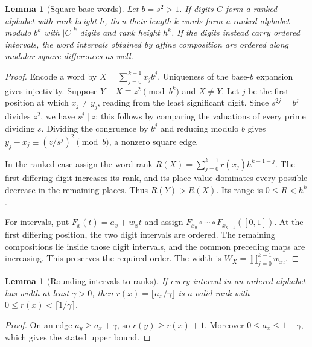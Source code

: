 \documentclass[11pt]{article}
\newtheorem{lemma}[theorem]{Lemma}
\theoremstyle{definition}
\theoremstyle{remark}
\newcommand{\card}[1]{\lvert #1\rvert}
\begin{document}
\begin{lemma}[Square-base words]\label{lem:words}
Let $b=s^2>1$. If digits $C$ form a ranked alphabet with rank height $h$,
then their length-$k$ words form a ranked alphabet modulo $b^k$ with
$\card C^k$ digits and rank height $h^k$. If the digits instead carry
ordered intervals, the word intervals obtained by affine composition are
ordered along modular square differences as well.
\end{lemma}
\begin{proof}
Encode a word by $X=\sum_{j=0}^{k-1}x_jb^j$. Uniqueness of the base-$b$
expansion gives injectivity. Suppose $Y-X\equiv z^2\pmod{b^k}$ and $X\ne Y$.
Let $j$ be the first position at which $x_j\ne y_j$, reading from the
least significant digit. Since $s^{2j}=b^j$ divides $z^2$, we have
$s^j\mid z$: this follows by comparing the valuations of every prime
dividing $s$. Dividing the congruence by $b^j$ and reducing modulo $b$
gives $y_j-x_j\equiv(z/s^j)^2\pmod b$, a nonzero square edge.

In the ranked case assign the word rank
$R(X)=\sum_{j=0}^{k-1}r(x_j)h^{k-1-j}$. The first differing digit increases
its rank, and its place value dominates every possible decrease in the
remaining places. Thus $R(Y)>R(X)$. Its range is $0\le R<h^k$.

For intervals, put $F_x(t)=a_x+w_xt$ and assign
$F_{x_0}\circ\cdots\circ F_{x_{k-1}}([0,1])$. At the first differing
position, the two digit intervals are ordered. The remaining compositions
lie inside those digit intervals, and the common preceding maps are
increasing. This preserves the required order. The width is
$W_X=\prod_{j=0}^{k-1}w_{x_j}$.
\end{proof}

\begin{lemma}[Rounding intervals to ranks]\label{lem:round}
If every interval in an ordered alphabet has width at least $\gamma>0$,
then $r(x)=\lfloor a_x/\gamma\rfloor$ is a valid rank with
$0\le r(x)<\lceil1/\gamma\rceil$.
\end{lemma}
\begin{proof}
On an edge $a_y\ge a_x+\gamma$, so $r(y)\ge r(x)+1$.
Moreover $0\le a_x\le1-\gamma$, which gives the stated upper bound.
\end{proof}
\end{document}
